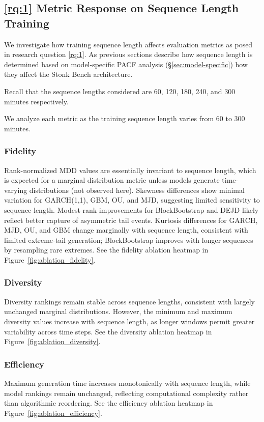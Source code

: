   \subsection{\ref{rq:1} Metric Response on Sequence Length Training}
    We investigate how training sequence length affects evaluation
    metrics as posed in research question \ref{rq:1}.
    As previous sections describe how sequence length is determined
    based on model-specific PACF analysis (§\ref{sec:model-specific})
    how they affect the Stonk Bench architecture.

    Recall that the sequence lengths considered are 60, 120, 180, 240,
    and 300 minutes respectively.

  We analyze each metric as the training sequence length varies from
  60 to 300 minutes.

\subsubsection{Fidelity}
  Rank-normalized MDD values are essentially invariant to sequence
  length, which is expected for a marginal distribution metric unless
  models generate time-varying distributions (not observed here).
  Skewness differences show minimal variation for GARCH(1,1), GBM, OU,
  and MJD, suggesting limited sensitivity to sequence length. Modest
  rank improvements for BlockBootstrap and DEJD likely reflect better
  capture of asymmetric tail events. Kurtosis differences for GARCH,
  MJD, OU, and GBM change marginally with sequence length, consistent
  with limited extreme-tail generation; BlockBootstrap improves with
  longer sequences by resampling rare extremes. See the fidelity
  ablation heatmap in Figure~\ref{fig:ablation_fidelity}.

\subsubsection{Diversity}
  Diversity rankings remain stable across sequence lengths, consistent
  with largely unchanged marginal distributions. However, the minimum
  and maximum diversity values increase with sequence length, as longer
  windows permit greater variability across time steps. See the
  diversity ablation heatmap in Figure~\ref{fig:ablation_diversity}.

\subsubsection{Efficiency}
  Maximum generation time increases monotonically with sequence length,
  while model rankings remain unchanged, reflecting computational
  complexity rather than algorithmic reordering. See the efficiency
  ablation heatmap in Figure~\ref{fig:ablation_efficiency}.

